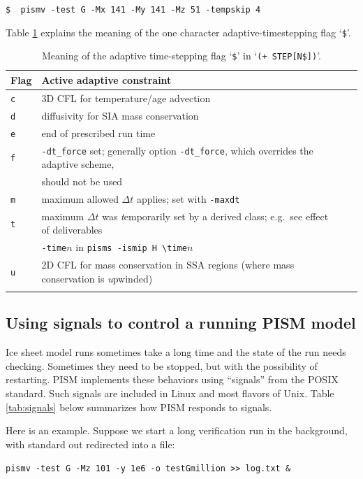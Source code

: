\documentclass[11pt,final]{amsart}
\begin{document}
\verb|$  pismv -test G -Mx 141 -My 141 -Mz 51 -tempskip 4|

Table \ref{tab:adaptiveflag} explains the meaning of the one character adaptive-timestepping flag `\verb|$|'.

\begin{table}[ht]
\caption{Meaning of the adaptive time-stepping flag `\texttt{\$}' in `\texttt{(+    STEP[N\$])}'.}\label{tab:adaptiveflag}
\begin{tabular}{@{}llll}\hline
\textbf{Flag} & \textbf{Active adaptive constraint} \\ \hline
\verb|c| & 3D CFL for temperature/age advection \cite{BBL} \\
\verb|d| & diffusivity for SIA mass conservation \cite{BBL} \\
\verb|e| & end of prescribed run time \\
\verb|f| & \verb|-dt_force| set; generally option \verb|-dt_force|, which overrides the adaptive scheme, \\
 & should not be used  \\
\verb|m| & maximum allowed $\Delta t$ applies; set with \verb|-maxdt| \\
\verb|t| & maximum $\Delta t$ was \emph{t}emporarily set by a derived class; e.g.~see effect of deliverables \\
 & \verb|-time|$n$ in \verb|pisms -ismip H \time|$n$ \\
\verb|u| & 2D CFL for mass conservation in SSA regions (where mass conservation is \emph{u}pwinded)\\
\hline
\normalsize
\end{tabular}
\end{table}

\subsection{Using signals to control a running PISM model} \label{subsect:signal}  Ice sheet model runs sometimes take a long time and the state of the run needs checking.  Sometimes they need to be stopped, but with the possibility of restarting.  PISM implements these behaviors using ``signals'' from the POSIX standard.  Such signals are included in Linux and most flavors of Unix.  Table \ref{tab:signals} below summarizes how PISM responds to signals.

Here is an example.  Suppose we start a long verification run in the background, with standard out redirected into a file:

\verb|pismv -test G -Mz 101 -y 1e6 -o testGmillion >> log.txt &|
\end{document}
